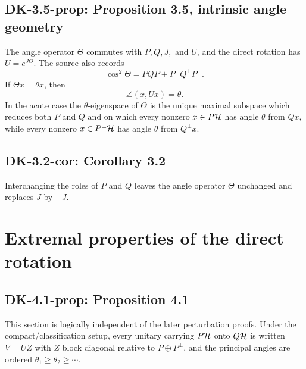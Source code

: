 \subsection*{DK-3.5-prop: Proposition 3.5, intrinsic angle geometry}
The angle operator $\Theta$ commutes with $P,Q,J,$ and $U$, and the direct rotation has $U=e^{J\Theta}$.  The source also records
\[
 \cos^2\Theta=PQP+P^\perp Q^\perp P^\perp.
\]
If $\Theta x=\theta x$, then
\[
 \angle(x,Ux)=\theta.
\]
In the acute case the $\theta$-eigenspace of $\Theta$ is the unique maximal subspace which reduces both $P$ and $Q$ and on which every nonzero $x\in P\mathcal{H}$ has angle $\theta$ from $Qx$, while every nonzero $x\in P^\perp\mathcal{H}$ has angle $\theta$ from $Q^\perp x$.

\subsection*{DK-3.2-cor: Corollary 3.2}
Interchanging the roles of $P$ and $Q$ leaves the angle operator $\Theta$ unchanged and replaces $J$ by $-J$.

\section{Extremal properties of the direct rotation}

\subsection*{DK-4.1-prop: Proposition 4.1}
This section is logically independent of the later perturbation proofs.  Under the compact/classification setup, every unitary carrying $P\mathcal{H}$ onto $Q\mathcal{H}$ is written $V=UZ$ with $Z$ block diagonal relative to $P\oplus P^\perp$, and the principal angles are ordered $\theta_1\ge\theta_2\ge\cdots$.

